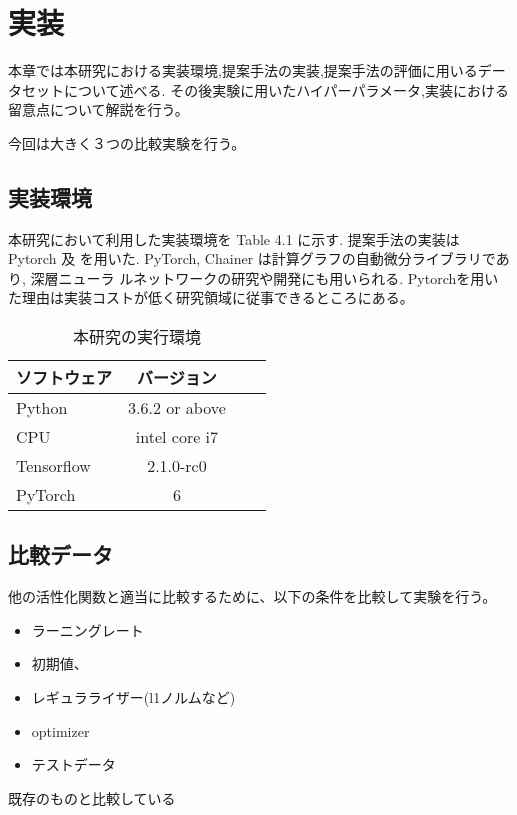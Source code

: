 \chapter{実装}
\label{implementation}

本章では本研究における実装環境,提案手法の実装,提案手法の評価に用いるデータセットについて述べる.
その後実験に用いたハイパーパラメータ,実装における留意点について解説を行う。

今回は大きく３つの比較実験を行う。



\section{実装環境}



本研究において利用した実装環境を Table 4.1 に示す. 提案手法の実装は Pytorch 及
を用いた.  PyTorch, Chainer は計算グラフの自動微分ライブラリであり, 深層ニューラ
ルネットワークの研究や開発にも用いられる.
Pytorchを用いた理由は実装コストが低く研究領域に従事できるところにある。



\begin{table}[htbp]
    \begin{center}
        \caption{本研究の実行環境}
        \vspace{5mm} 
        \begin{tabular}{l*{2}{c}r}
        ソフトウェア              & バージョン \\
        \hline
        Python            & 3.6.2 or above \\
        CPU               & intel core i7 \\
        Tensorflow        & 2.1.0-rc0 \\
        PyTorch           & 6 \\
        \end{tabular}
    \end{center}
\end{table}



\section{比較データ}

他の活性化関数と適当に比較するために、以下の条件を比較して実験を行う。
\begin{itemize}
    \item ラーニングレート
    \item 初期値、
    \item レギュラライザー(l1ノルムなど)
    \item optimizer
    \item テストデータ
\end{itemize}
既存のものと比較している
